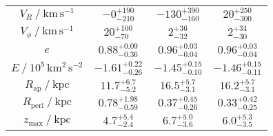 \begin{table}
\begin{tabular}{cccc}
$V_R~/~\mathrm{km\,s^{-1}}$ & $-0_{-210}^{+190}$ & $-130_{-160}^{+390}$ & $20_{-300}^{+250}$ \\
$V_\phi~/~\mathrm{km\,s^{-1}}$ & $20_{-70}^{+100}$ & $2_{-32}^{+36}$ & $2_{-30}^{+34}$ \\
$e$ & $0.88_{-0.36}^{+0.09}$ & $0.96_{-0.04}^{+0.03}$ & $0.96_{-0.04}^{+0.03}$ \\
$E~/~10^5\,\mathrm{km^{2}\,s^{-2}}$ & $-1.61_{-0.26}^{+0.22}$ & $-1.45_{-0.10}^{+0.15}$ & $-1.46_{-0.11}^{+0.15}$ \\
$R_\text{ap}~/~\mathrm{kpc}$ & $11.7_{-5.2}^{+6.7}$ & $16.5_{-3.1}^{+5.7}$ & $16.2_{-3.1}^{+5.7}$ \\
$R_\text{peri}~/~\mathrm{kpc}$ & $0.78_{-0.59}^{+1.98}$ & $0.37_{-0.26}^{+0.45}$ & $0.33_{-0.25}^{+0.42}$ \\
$z_\text{max}~/~\mathrm{kpc}$ & $4.7_{-2.4}^{+5.4}$ & $6.7_{-3.6}^{+5.0}$ & $6.0_{-3.5}^{+5.3}$ \\
\hline
\end{tabular}
\end{table}
\endgroup
